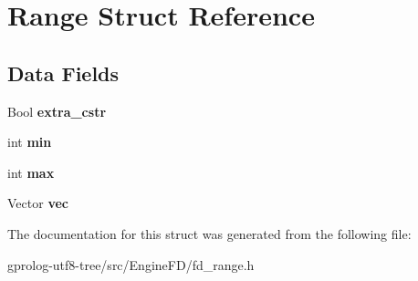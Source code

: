 \hypertarget{structRange}{}\section{Range Struct Reference}
\label{structRange}
\subsection*{Data Fields}
\begin{DoxyCompactItemize}
\item 
Bool {\bfseries extra\+\_\+cstr}\hypertarget{structRange_a875104bdfb7f25377692ee3511b6cda7}{}\label{structRange_a875104bdfb7f25377692ee3511b6cda7}

\item 
int {\bfseries min}\hypertarget{structRange_ac3ccecdd1d8e143102bb4c2b5c0837d7}{}\label{structRange_ac3ccecdd1d8e143102bb4c2b5c0837d7}

\item 
int {\bfseries max}\hypertarget{structRange_a7f490d5301f027e9defc4abf3970bf00}{}\label{structRange_a7f490d5301f027e9defc4abf3970bf00}

\item 
Vector {\bfseries vec}\hypertarget{structRange_aa1fc33857cb97860b7c55a8f90ad6e3f}{}\label{structRange_aa1fc33857cb97860b7c55a8f90ad6e3f}

\end{DoxyCompactItemize}


The documentation for this struct was generated from the following file\+:\begin{DoxyCompactItemize}
\item 
gprolog-\/utf8-\/tree/src/\+Engine\+F\+D/fd\+\_\+range.\+h\end{DoxyCompactItemize}
